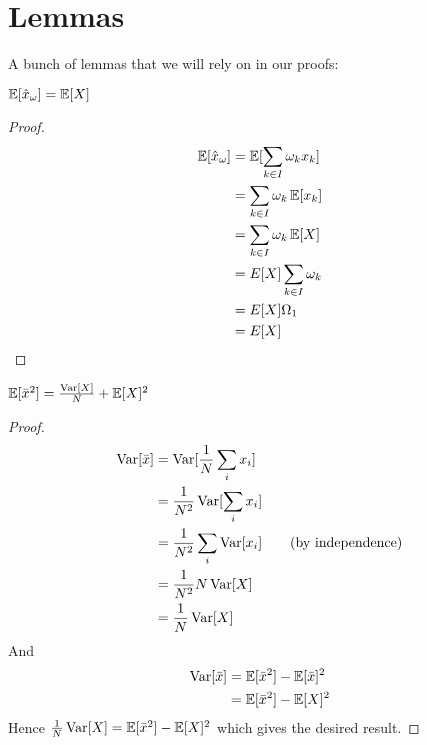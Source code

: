 \documentclass[11pt]{hw-template}
\begin{document}
\section*{Lemmas}
  A bunch of lemmas that we will rely on in our proofs:
  
    \begin{lemma}
      $\operatorname{\mathbb{E}}[\hat{x}_{\omega}] = \operatorname{\mathbb{E}}[X]$
    \end{lemma}
    
    \begin{proof}
      \begin{align*}
        \operatorname{\mathbb{E}}[\hat{x}_{\omega}] 
        &= \operatorname{\mathbb{E}}[\sum_{k \in I} \omega_k x_k]\\
        &= \sum_{k \in I} \omega_k \operatorname{\mathbb{E}}[x_k]\\
        &= \sum_{k \in I} \omega_k \operatorname{\mathbb{E}}[X]\\
        &= E[X] \sum_{k \in I} \omega_k\\
        &= E[X] \Omega_1\\
        &= E[X]
      \end{align*}
    \end{proof}
    
    \begin{lemma}
      $\operatorname{\mathbb{E}}[\bar{x}^2] = \frac{\operatorname{Var}[X]}{N} + \operatorname{\mathbb{E}}[X]^2$
    \end{lemma}
    \begin{proof}
      \begin{align*}
        \operatorname{Var}[\bar{x}] 
        &= \operatorname{Var}[\frac{1}{N}\sum_i x_i]\\
        &= \frac{1}{N^2}\operatorname{Var}[\sum_i x_i]\\
        &= \frac{1}{N^2}\sum_i \operatorname{Var}[x_i] \tag{by independence}\\
        &= \frac{1}{N^2}N\operatorname{Var}[X]\\
        &= \frac{1}{N}\operatorname{Var}[X]
      \end{align*}
      And
      \begin{align*}
        \operatorname{Var}[\bar{x}] 
        &= \operatorname{\mathbb{E}}[\bar{x}^2] - \operatorname{\mathbb{E}}[\bar{x}]^2\\
        &= \operatorname{\mathbb{E}}[\bar{x}^2] - \operatorname{\mathbb{E}}[X]^2\\
      \end{align*}
      Hence $\frac{1}{N}\operatorname{Var}[X] = \operatorname{\mathbb{E}}[\bar{x}^2] - \operatorname{\mathbb{E}}[X]^2$ which gives the desired result.
    \end{proof}
\end{document}

